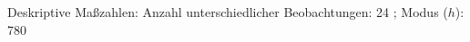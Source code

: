				\label{tableValues:bvoc05b_g1}
				\vspace*{-\baselineskip}
                    \begin{noten}
                	    \note{} Deskriptive Maßzahlen:
                	    Anzahl unterschiedlicher Beobachtungen: 24%
                	    ; 
                	      Modus ($h$): 780
                     \end{noten}

